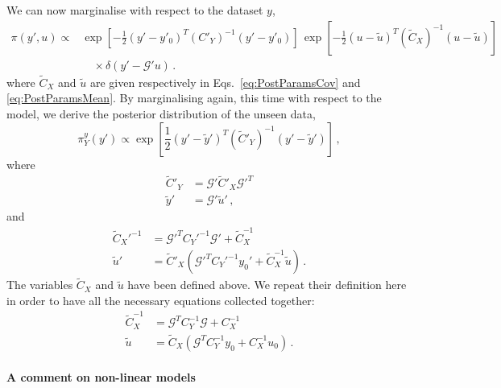 We can now marginalise with respect to the dataset $y$, 
\begin{equation}
  \label{eq:MarginaliseDatasetY}
  \begin{split}
    \pi(y',u) 
    \propto &
    \exp\left[-\frac12 \left(y'-y'_0\right)^T (C'_{Y})^{-1} 
    \left(y'-y'_0\right)\right]\, 
    \exp\left[-\frac12 \left(u-\tilde{u}\right)^T (\tilde{C}_{X})^{-1} 
    \left(u-\tilde{u}\right)\right] \\
    & \quad \times \delta\left(y'- \mathcal{G}'u\right)\, .
  \end{split}
\end{equation}
where $\tilde{C}_{X}$ and $\tilde{u}$ are given respectively in
Eqs.~\ref{eq:PostParamsCov} and \ref{eq:PostParamsMean}. By marginalising again,
this time with respect to the model, we derive the posterior distribution of the
unseen data,
\begin{equation}
  \label{eq:MarginaliseModelU}
  \pi^y_{Y}(y') \propto 
  \exp \left[ 
   \frac12 \left(y' - \tilde{y}'\right)^T
   (\tilde{C}'_{Y})^{-1} 
   \left(y' - \tilde{y}'\right)
   \right]\, ,
\end{equation}
where
\begin{align}
  \tilde{C}'_{Y} 
  &= \mathcal{G}' \tilde{C}'_{X} \mathcal{G}'^{T} \\
  \tilde{y}'
  &= \mathcal{G}' \tilde{u}'\, ,
\end{align}
and 
\begin{align}
  \label{eq:ModelPostSequential}
  \tilde{C}_{X}'^{-1} 
  &= \mathcal{G}'^T C_{Y}'^{-1} \mathcal{G}' + \tilde{C}_{X}^{-1} \\
  \tilde{u}' 
  &= \tilde{C}'_{X} \left(
    \mathcal{G}'^T C_{Y}'^{-1} y_0' + \tilde{C}_{X}^{-1} \tilde{u} 
    \right) \, .
\end{align}
The variables $\tilde{C}_{X}$ and $\tilde{u}$ have been defined above. We repeat
their definition here in order to have all the necessary equations collected
together: 
\begin{align}
  \tilde{C}_{X}^{-1}
  &= \mathcal{G}^T C_{Y}^{-1} \mathcal{G} + C_{X}^{-1} \\
  \tilde{u}
  &= \tilde{C}_{X} \left(
    \mathcal{G}^T C_{Y}^{-1} y_0 + C_{X}^{-1} u_0
  \right)\, .
\end{align}

\paragraph{A comment on non-linear models}

